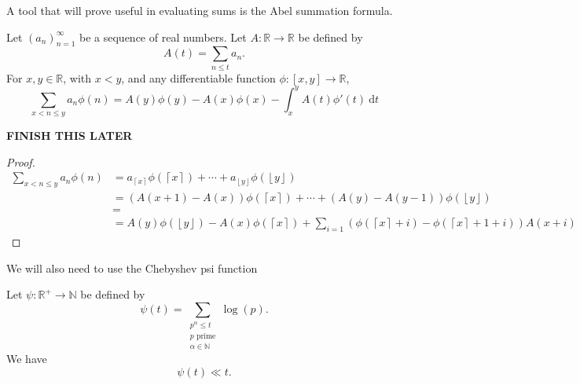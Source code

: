 \documentclass[12pt]{amsart}
\begin{document}
A tool that will prove useful in evaluating sums is the Abel summation formula.

\begin{lemma*}
Let \(\left( a_{n}  \right) _{n = 1} ^{\infty }\) be a sequence of real numbers. Let \(A: \mathbb{R} \to \mathbb{R} \) be defined by
\[
    A(t) = \sum _{n \leq t} a_{n} 
.\]
For \(x,y \in \mathbb{R} \), with \(x < y\), and any differentiable function \(\phi : [x,y] \to \mathbb{R} \),
\[
    \sum _{x < n \leq y} a_{n} \phi(n) = A(y)\phi(y) - A(x) \phi(x) - \int_{x}^{y} A(t)\phi'(t) ~\mathrm{d} t
\]
\end{lemma*}

\textbf{FINISH THIS LATER}
\begin{proof}
\begin{align*}
    \sum _{x < n \leq y} a_{n} \phi(n) & = a_{\left\lceil x \right\rceil } \phi(\left\lceil x \right\rceil ) + \cdots  + a_{\left\lfloor y \right\rfloor } \phi(\left\lfloor y \right\rfloor )\\
    & = \left( A(x + 1) - A(x) \right) \phi(\left\lceil x \right\rceil ) + \cdots + \left( A(y) - A(y-1) \right) \phi(\left\lfloor y \right\rfloor ) \\
    & = \\
    & = A(y) \phi\left( \left\lfloor y \right\rfloor \right)  - A(x)\phi\left( \left\lceil x \right\rceil  \right) + \sum_{i= 1 }^{} \left( \phi\left( \left\lceil x \right\rceil + i \right) - \phi\left( \left\lceil x \right\rceil + 1 + i \right) \right) A(x + i)  
\end{align*}
\end{proof}

We will also need to use the Chebyshev psi function

\begin{lemma}
Let \(\psi : \mathbb{R} ^{+} \to \mathbb{N}  \) be defined by
\[
    \psi(t) = \sum _{\substack{ p ^{\alpha}\leq t \\ p \text{ prime} \\ \alpha \in \mathbb{N} }} \log \left( p \right) 
.\]
We have
\[
    \psi(t) \ll t
.\]
\end{lemma}
\end{document}
